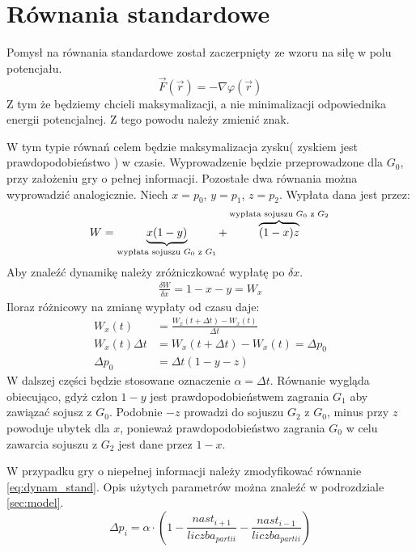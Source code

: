 \section{Równania standardowe}
\label{sec:r_stand}
Pomysł na równania standardowe został zaczerpnięty ze wzoru na siłę w polu potencjału.
\begin{equation}
\overrightarrow{F}(\overrightarrow{r})=-\nabla \varphi (\overrightarrow{r})
\end{equation}
Z tym że będziemy chcieli maksymalizacji, a nie minimalizacji odpowiednika energii potencjalnej. Z tego powodu należy zmienić znak.

W tym typie równań celem będzie maksymalizacja zysku( zyskiem jest prawdopodobieństwo ) w czasie. Wyprowadzenie będzie przeprowadzone dla $G_0$, przy założeniu gry o pełnej informacji. Pozostałe dwa równania można wyprowadzić analogicznie. Niech $x=p_0$, $y=p_1$, $z=p_2$. Wypłata dana jest przez:
\begin{equation}\label{eq:wypl_stand}
W = \underbrace{x(1-y)}_{\text{wypłata sojuszu $G_0$ z $G_1$}} + \overbrace{(1-x)z}^{\text{wypłata sojuszu $G_0$ z $G_2$}} \\
\end{equation}
Aby znaleźć dynamikę należy zróżniczkować wypłatę po $\delta x$.
\begin{align*}
\frac{\delta W}{\delta x} = 1-x-y = W_x
\end{align*}
Iloraz różnicowy na zmianę wypłaty od czasu daje:
\begin{align}\label{eq:dynam_stand}
W_x(t) &= \frac{W_x(t+\Delta t)-W_x(t)}{\Delta t} \nonumber\\
W_x(t) \Delta t &= W_x(t+\Delta t)-W_x(t) = \Delta p_0 \nonumber\\
\Delta p_0 &= \Delta t (1-y-z)
\end{align}
W dalszej części będzie stosowane oznaczenie $\alpha = \Delta t$. Równanie wygląda obiecująco, gdyż człon $1 - y$ jest prawdopodobieństwem zagrania $G_1$ aby zawiązać sojusz z $G_0$. Podobnie $-z$ prowadzi do sojuszu $G_2$ z $G_0$, minus przy $z$ powoduje ubytek dla $x$, ponieważ prawdopodobieństwo zagrania $G_0$ w celu zawarcia sojuszu z $G_2$ jest dane przez $1-x$.

W przypadku gry o niepełnej informacji należy zmodyfikować równanie \ref{eq:dynam_stand}. Opis użytych parametrów można znaleźć w podrozdziale \ref{sec:model}.
\begin{equation} \label{eq:stand}
\Delta p_i = \alpha \cdot (1 - \frac{nast_{i+1}}{liczba_{partii}} - \frac{nast_{i-1}}{liczba_{partii}})
\end{equation}

